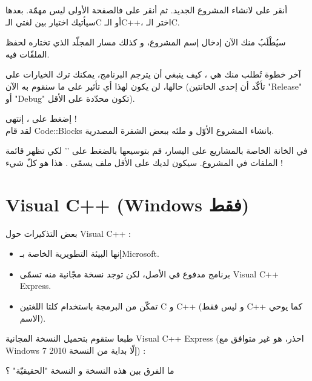 أنقر على
لانشاء المشروع الجديد. ثم أنقر على
فالصفحة الأولى ليس مهمّة. بعدها سيأتيك اختيار بين لغتي الـ\textenglish{C}
أو الـ\textenglish{C++}،
اختر الـ\textenglish{C}.


سيُطْلَبُ منك الآن إدخال إسم المشروع، و كذلك مسار المجلّد الذي تختاره لحفظ الملفّات فيه.


آخر خطوة تُطلب منك هي ، كيف ينبغي أن يترجم البرنامج، يمكنك ترك الخيارات على حالها، لن يكون لهذا أي تأثير على ما سنقوم به الآن (تأكّد أن إحدى الخانتين
"\textenglish{Release}"
أو
"\textenglish{Debug}"
تكون محدّدة على الأقل).


إضغط على
،
إنتهى !\\
لقد قام
\textenglish{Code::Blocks}
بانشاء المشروع الأوّل و ملئه ببعض الشفرة المصدرية.

في الخانة الخاصة بالمشاريع على اليسار، قم بتوسيعها بالضغط على
'\InlineCode{+}'
لكي تظهر قائمة الملفات في المشروع. سيكون لديك على الأقل ملف يسمّى
.
هذا هو كلّ شيء !

\section{\textenglish{Visual C++} (\textenglish{Windows} فقط)}

بعض التذكيرات حول
\textenglish{Visual C++} :

\begin{itemize}
  \item إنها البيئة التطويرية الخاصة بـ\textenglish{Microsoft}.
  \item برنامج مدفوع في الأصل، لكن توجد نسخة مجّانية منه تسمّى \textenglish{Visual C++ Express}.
  \item تمكّن من البرمجة باستخدام كلتا اللغتين
\textenglish{C}
و
\textenglish{C++}
(و ليس فقط
\textenglish{C++}
كما يوحي الاسم).
\end{itemize}

طبعا ستقوم بتحميل النسخة المجانية
\textenglish{Visual C++ Express}
(احذر، هو غير متوافق مع
\textenglish{Windows 7}
إلّا بداية من النسخة 2010) :


\begin{question}
ما الفرق بين هذه النسخة و النسخة "الحقيقيّة" ؟
\end{question}

